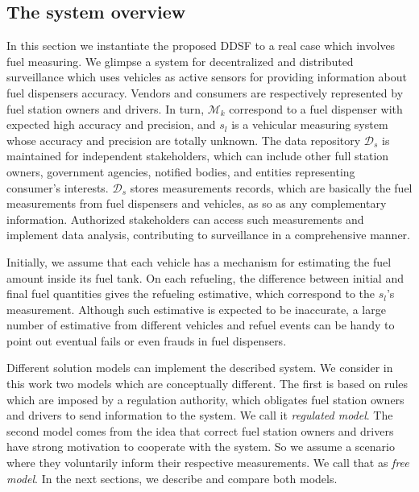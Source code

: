 \documentclass[sigplan]{acmart}
\begin{document}
\subsection{The system overview}
In this section we instantiate the proposed DDSF to a real case which involves fuel measuring.
We glimpse a system for decentralized and distributed surveillance which uses vehicles as active sensors for providing information about fuel dispensers accuracy.
Vendors and consumers are respectively represented by fuel station owners and drivers.
In turn, $\mathcal{M}_k$ correspond to a fuel dispenser with expected high accuracy and precision, and $s_l$ is a vehicular measuring system whose accuracy and precision are totally unknown.
The data repository $\mathcal{D}_s$ is maintained for independent stakeholders, which can include other full station owners, government agencies, notified bodies, and entities representing consumer's interests.
$\mathcal{D}_s$ stores measurements records, which are basically the fuel measurements from fuel dispensers and vehicles, as so as any complementary information.
Authorized stakeholders can access such measurements and implement data analysis, contributing to surveillance in a comprehensive manner.


Initially, we assume that each vehicle has a mechanism for estimating the fuel amount inside its fuel tank.
On each refueling, the difference between initial and final fuel quantities gives the refueling estimative, which correspond to the $s_l$'s measurement.
Although such estimative is expected to be inaccurate, a large number of estimative from different vehicles and refuel events can be handy to point out eventual fails or even frauds in fuel dispensers.

Different solution models can implement the described system.
We consider in this work two models which are conceptually different.
The first is based on rules which are imposed by a regulation authority, which obligates fuel station owners and drivers to send information to the system. We call it \emph{regulated model}.
The second model comes from the idea that correct fuel station owners and drivers have strong motivation to cooperate with the system.
So we assume a scenario where they voluntarily inform their respective measurements.
We call that as \emph{free model}.
In the next sections, we describe and compare both models.
\end{document}
